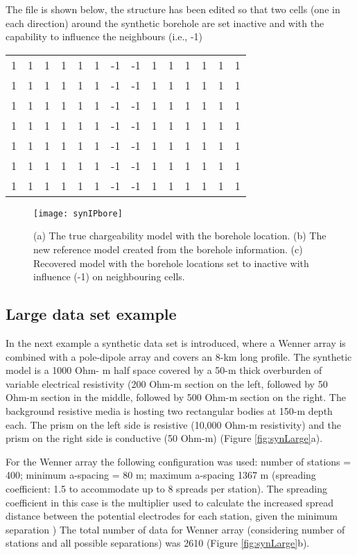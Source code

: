 The  file is shown below, the structure has been edited so that two cells (one in each direction) around the synthetic borehole are set inactive and with the capability to influence the neighbours (i.e., -1)
\begin{fileExample}
\begin{tabular}{|cccccccccccccc|}
\hline
1 & 1 & 1 & 1 & 1 & 1 & -1 & -1 & 1 & 1 & 1 & 1 & 1 & 1 \\
1 & 1 & 1 & 1 & 1 & 1 & -1 & -1 & 1 & 1 & 1 & 1 & 1 & 1 \\
1 & 1 & 1 & 1 & 1 & 1 & -1 & -1 & 1 & 1 & 1 & 1 & 1 & 1 \\
1 & 1 & 1 & 1 & 1 & 1 & -1 & -1 & 1 & 1 & 1 & 1 & 1 & 1 \\
1 & 1 & 1 & 1 & 1 & 1 & -1 & -1 & 1 & 1 & 1 & 1 & 1 & 1 \\
1 & 1 & 1 & 1 & 1 & 1 & -1 & -1 & 1 & 1 & 1 & 1 & 1 & 1 \\
1 & 1 & 1 & 1 & 1 & 1 & -1 & -1 & 1 & 1 & 1 & 1 & 1 & 1 \\
\hline
\end{tabular}
\end{fileExample}
%
\begin{figure}
\centering
\texttt{[image: synIPbore]}
\caption{(a) The true chargeability model with the borehole location. (b) The new reference model created from the borehole information. (c) Recovered model with the borehole locations set to inactive with influence (-1) on neighbouring cells.}
\label{fig:synIPbore}
\end{figure}

\subsection{Large data set example}
In the next example a synthetic data set is introduced, where a Wenner array is combined with a pole-dipole array and covers an 8-km long profile. The synthetic model is a 1000 Ohm- m half space covered by a 50-m thick overburden of variable electrical resistivity (200 Ohm-m section on the left, followed by 50 Ohm-m section in the middle, followed by 500 Ohm-m section on the right. The background resistive media is hosting two rectangular bodies at 150-m depth each. The prism on the left side is resistive (10,000 Ohm-m resistivity) and the prism on the right side is conductive (50 Ohm-m) (Figure \ref{fig:synLarge}a).

For the Wenner array the following configuration was used: number of stations = 400; minimum a-spacing = 80 m; maximum a-spacing 1367 m (spreading coefficient: 1.5 to accommodate up to 8 spreads per station). The spreading coefficient in this case is the multiplier used to calculate the increased spread distance between the potential electrodes for each station, given the minimum separation ) The total number of data for Wenner array (considering number of stations and all possible separations) was 2610 (Figure \ref{fig:synLarge}b).

